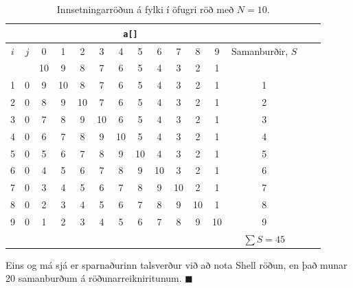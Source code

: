 \documentclass[12pt, a4paper, hidelinks]{article}
\begin{document}
\newcommand{\g}{\color{lightgray}}
\newcommand{\curr}{\color{red}}
\begin{table}[ht!]
    \centering
    \begin{tabular}[pos]{cc|ccccccccccccc}
    \multicolumn{2}{c}{} & \multicolumn{10}{c}{\texttt{a[]}} \\
    \toprule
    $i$ & $j$ & 0 & 1 & 2 & 3 & 4 & 5 & 6 & 7 & 8  & 9 & Samanburðir, $S$ \\
    \midrule
        &     & 10 & 9 & 8 & 7 & 6 & 5 & 4 & 3 & 2 & 1 \\
    1   & 0   & \curr 9 & 10 & \g 8 & \g 7 & \g 6 & \g 5 & \g 4 & \g 3 & \g 2 & \g 1 & 1 \\
    2   & 0   & \curr 8 & 9  & 10 & \g 7 & \g 6 & \g 5 & \g 4 & \g 3 & \g 2 & \g 1 & 2 \\ 
    3   & 0   & \curr 7 & 8  & 9  & 10 & \g 6 & \g 5 & \g 4 & \g 3 & \g 2 & \g 1 & 3\\ 
    4   & 0   & \curr 6 & 7  & 8  & 9  & 10 & \g 5 & \g 4 & \g 3 & \g 2 & \g 1 & 4\\
    5   & 0   & \curr 5 & 6  & 7  & 8  & 9  & 10 & \g 4 & \g 3 & \g 2 & \g 1 & 5 \\
    6   & 0   & \curr 4 & 5 & 6 & 7 & 8 & 9 & 10 & \g 3 & \g 2 & \g 1 & 6 \\
    7   & 0   & \curr 3 & 4 & 5 & 6 & 7 & 8 & 9 & 10 & \g 2 & \g 1 & 7 \\
    8   & 0   & \curr 2 & 3 & 4 & 5 & 6 & 7 & 8 & 9 & 10 & \g 1 & 8 \\
    9   & 0   & \curr 1 & 2 & 3 & 4 & 5 & 6 & 7 & 8 & 9 & 10 & 9 \\
    \midrule
    \multicolumn{12}{c}{} & $\sum S = 45$ \\
    \bottomrule
    \end{tabular}
    \caption{Innsetningarröðun á fylki í öfugri röð með $N = 10$.}
\end{table}
\noindent
Eins og má sjá er sparnaðurinn talsverður við að nota Shell röðun, en það munar 20 samanburðum
á röðunarreikniritunum. $\blacksquare$
\end{document}

